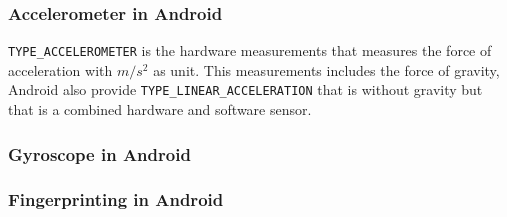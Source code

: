 \subsubsection{Accelerometer in Android}
\texttt{TYPE\_ACCELEROMETER} is the hardware measurements that measures the force of acceleration with $m/s^2$ as unit. 
This measurements includes the force of gravity, Android also provide \texttt{TYPE\_LINEAR\_ACCELERATION} that is without gravity but that is a combined hardware and software sensor. 

\subsubsection{Gyroscope in Android}

\subsubsection{Fingerprinting in Android}


